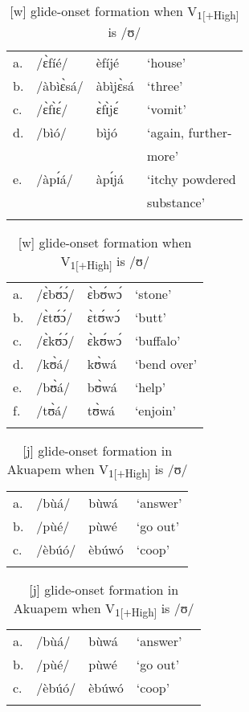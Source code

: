 \documentclass[output=paper,colorlinks,citecolor=brown]{langscibook}
\begin{document}
\begin{table}
\begin{floatrow}
\ttabbox
 {\begin{tabular}{l@{~~}lll}
  \lsptoprule
a. & /ɛ̀fíé/	& èfíjé	&‘house’\\
b. & /àbìɛ̀sá/	 & àbìjɛ̀sá	&‘three’\\
c. &/ɛ̀fɪ̀ɛ́/ & ɛ̀fɪ̀jɛ́  &	‘vomit’\\
d. &/bìó/ & bìjó & ‘again, further-\\
   &      &      & \quad more’\\
e. & /àpɪ́á/ & àpɪ́já	& ‘itchy powdered \\
   &        &       & \quad substance’\\
  \lspbottomrule
 \end{tabular}}
{\caption{[j] glide-onset formation when V\textsubscript{1[+High]} is /i/ or /ɪ/}\label{tab:Table3}}

\ttabbox
 {\begin{tabular}{l@{~~}lll}
  \lsptoprule
a. & /ɛ̀bʊ́ɔ́/	&ɛ̀bʊ́wɔ́	&‘stone’\\
b.& /ɛ̀tʊ́ɔ́/	&ɛ̀tʊ́wɔ́	&‘butt’\\
c.& /ɛ̀kʊ́ɔ́/	&ɛ̀kʊ́wɔ́	&‘buffalo’\\
d. & /kʊ̀á/	&kʊ̀wá	&‘bend over’\\
e.& /bʊ̀á/	&bʊ̀wá	&‘help’\\
f.&  /tʊ̀á/	 &tʊ̀wá	&‘enjoin’\\
  \lspbottomrule
 \end{tabular}}
{\caption{[w] glide-onset formation when V\textsubscript{1[+High]} is /ʊ/}\label{tab:Table4}}
\end{floatrow}
\end{table}   

\begin{table}
\captionsetup{margin=.05\linewidth}
\begin{floatrow}
\ttabbox
 {\begin{tabular}{l@{~~}lll}
  \lsptoprule
a.& /bùá/ &bùwá	&‘answer’\\
b.& /pùé/	 &pùwé	&‘go out’\\
c. &/èbúó/ &	èbúwó	&‘coop’\\
  \lspbottomrule
 \end{tabular}}
{\caption{[w] glide-onset formation when V\textsubscript{1[+High]} is /u/}\label{tab:Table5}}

\ttabbox
 {\begin{tabular}{l@{~~}llll}
  \lsptoprule
a.& /bùá/ &bùwá	&‘answer’\\
b.& /pùé/	 &pùwé	&‘go out’\\
c. &/èbúó/ &	èbúwó	&‘coop’\\
  \lspbottomrule
 \end{tabular}}
{\caption{[j] glide-onset formation in Akuapem when V\textsubscript{1[+High]} is /ʊ/}\label{tab:Table6}}
\end{floatrow}
\end{table}   
\end{document}
